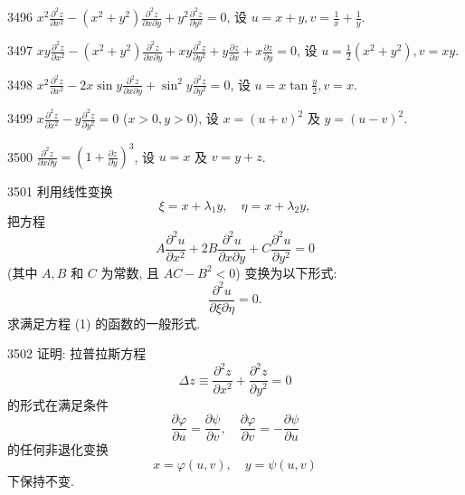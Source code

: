 \begin{prob}[S]{3496}
$x^2\frac{\partial^2 z}{\partial x^2} - (x^2+y^2)\frac{\partial^2 z}{\partial x\partial y} + y^2\frac{\partial^2 z}{\partial y^2} = 0$, 设 $u = x+y, v = \frac{1}{x} + \frac{1}{y}$.
\end{prob}

\begin{prob}[S]{3497}
$xy\frac{\partial^2 z}{\partial x^2} - (x^2+y^2)\frac{\partial^2 z}{\partial x\partial y} + xy\frac{\partial^2 z}{\partial y^2} + y\frac{\partial z}{\partial x} + x\frac{\partial z}{\partial y} = 0$, 设 $u = \frac{1}{2}(x^2+y^2), v = xy$.
\end{prob}

\begin{prob}[S]{3498}
$x^2\frac{\partial^2 z}{\partial x^2} - 2x\sin y\frac{\partial^2 z}{\partial x\partial y} + \sin^2 y\frac{\partial^2 z}{\partial y^2} = 0$, 设 $u = x\tan\frac{y}{2}, v = x$.
\end{prob}

\begin{prob}[S]{3499}
$x\frac{\partial^2 z}{\partial x^2} - y\frac{\partial^2 z}{\partial y^2} = 0$ ($x > 0, y > 0$), 设 $x = (u+v)^2$ 及 $y = (u-v)^2$.
\end{prob}

\begin{prob}[S]{3500}
$\frac{\partial^2 z}{\partial x\partial y} = \left(1+\frac{\partial z}{\partial y}\right)^3$, 设 $u = x$ 及 $v = y+z$.
\end{prob}

\begin{prob}[M]{3501}
利用线性变换
\[
\xi = x + \lambda_1 y, \quad \eta = x + \lambda_2 y,
\]
把方程
\[
A\frac{\partial^2 u}{\partial x^2} + 2B\frac{\partial^2 u}{\partial x\partial y} + C\frac{\partial^2 u}{\partial y^2} = 0 \tag{1}
\]
(其中 $A, B$ 和 $C$ 为常数, 且 $AC - B^2 < 0$) 变换为以下形式:
\[
\frac{\partial^2 u}{\partial\xi\partial\eta} = 0.
\]
求满足方程 (1) 的函数的一般形式.
\end{prob}

\begin{prob}[M]{3502}
证明: 拉普拉斯方程
\[
\Delta z \equiv \frac{\partial^2 z}{\partial x^2} + \frac{\partial^2 z}{\partial y^2} = 0
\]
的形式在满足条件
\[
\frac{\partial \varphi}{\partial u} = \frac{\partial \psi}{\partial v}, \quad \frac{\partial \varphi}{\partial v} = -\frac{\partial \psi}{\partial u}
\]
的任何非退化变换
\[
x = \varphi(u, v), \quad y = \psi(u, v)
\]
下保持不变.
\end{prob}

